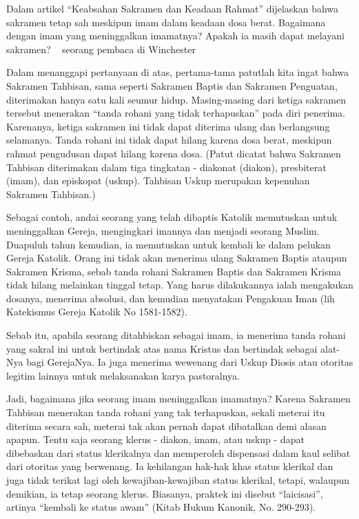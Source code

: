 
Dalam artikel “Keabsahan Sakramen dan Keadaan Rahmat” dijelaskan bahwa sakramen tetap sah meskipun imam dalam keadaan dosa berat. Bagaimana dengan imam yang meninggalkan imamatnya? Apakah ia masih dapat melayani sakramen?
~ seorang pembaca di Winchester

Dalam menanggapi pertanyaan di atas, pertama-tama patutlah kita ingat bahwa Sakramen Tahbisan, sama seperti Sakramen Baptis dan Sakramen Penguatan, diterimakan hanya satu kali seumur hidup. Masing-masing dari ketiga sakramen tersebut menerakan “tanda rohani yang tidak terhapuskan” pada diri penerima. Karenanya, ketiga sakramen ini tidak dapat diterima ulang dan berlangsung selamanya. Tanda rohani ini tidak dapat hilang karena dosa berat, meskipun rahmat pengudusan dapat hilang karena dosa. (Patut dicatat bahwa Sakramen Tahbisan diterimakan dalam tiga tingkatan - diakonat (diakon), presbiterat (imam), dan episkopat (uskup). Tahbisan Uskup merupakan kepenuhan Sakramen Tahbisan.)

Sebagai contoh, andai seorang yang telah dibaptis Katolik memutuskan untuk meninggalkan Gereja, mengingkari imannya dan menjadi seorang Muslim. Duapuluh tahun kemudian, ia memutuskan untuk kembali ke dalam pelukan Gereja Katolik. Orang ini tidak akan menerima ulang Sakramen Baptis ataupun Sakramen Krisma, sebab tanda rohani Sakramen Baptis dan Sakramen Krisma tidak hilang melainkan tinggal tetap. Yang harus dilakukannya ialah mengakukan dosanya, menerima absolusi, dan kemudian menyatakan Pengakuan Iman (lih Katekismus Gereja Katolik No 1581-1582).

Sebab itu, apabila seorang ditahbiskan sebagai imam, ia menerima tanda rohani yang sakral ini untuk bertindak atas nama Kristus dan bertindak sebagai alat-Nya bagi GerejaNya. Ia juga menerima wewenang dari Uskup Diosis atau otoritas legitim lainnya untuk melaksanakan karya pastoralnya.

Jadi, bagaimana jika seorang imam meninggalkan imamatnya? Karena Sakramen Tahbisan menerakan tanda rohani yang tak terhapuskan, sekali meterai itu diterima secara sah, meterai tak akan pernah dapat dibatalkan demi alasan apapun. Tentu saja seorang klerus - diakon, imam, atau uskup - dapat dibebaskan dari status klerikalnya dan memperoleh dispensasi dalam kaul selibat dari otoritas yang berwenang. Ia kehilangan hak-hak khas status klerikal dan juga tidak terikat lagi oleh kewajiban-kewajiban status klerikal, tetapi, walaupun demikian, ia tetap seorang klerus. Biasanya, praktek ini disebut “laicisasi”, artinya “kembali ke status awam” (Kitab Hukum Kanonik, No. 290-293).

